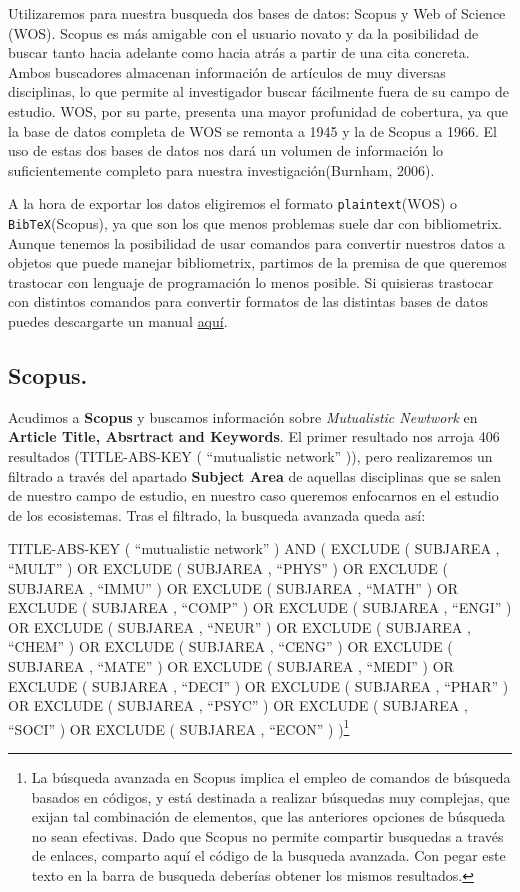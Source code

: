 \documentclass[
]{article}
\begin{document}
Utilizaremos para nuestra busqueda dos bases de datos: Scopus y Web of
Science (WOS). Scopus es más amigable con el usuario novato y da la
posibilidad de buscar tanto hacia adelante como hacia atrás a partir de
una cita concreta. Ambos buscadores almacenan información de artículos
de muy diversas disciplinas, lo que permite al investigador buscar
fácilmente fuera de su campo de estudio. WOS, por su parte, presenta una
mayor profunidad de cobertura, ya que la base de datos completa de WOS
se remonta a 1945 y la de Scopus a 1966. El uso de estas dos bases de
datos nos dará un volumen de información lo suficientemente completo
para nuestra investigación(Burnham, 2006).

A la hora de exportar los datos eligiremos el formato
\texttt{plaintext}(WOS) o \texttt{BibTeX}(Scopus), ya que son los que
menos problemas suele dar con bibliometrix. Aunque tenemos la
posibilidad de usar comandos para convertir nuestros datos a objetos que
puede manejar bibliometrix, partimos de la premisa de que queremos
trastocar con lenguaje de programación lo menos posible. Si quisieras
trastocar con distintos comandos para convertir formatos de las
distintas bases de datos puedes descargarte un manual
\href{https://www.bibliometrix.org/vignettes/Data-Importing-and-Converting.html}{aquí}.

\hypertarget{scopus.}{%
\subsection{Scopus.}\label{scopus.}}

Acudimos a \textbf{Scopus} y buscamos información sobre
\emph{Mutualistic Newtwork} en \textbf{Article Title, Absrtract and
Keywords}. El primer resultado nos arroja 406 resultados (TITLE-ABS-KEY
( ``mutualistic network'' )), pero realizaremos un filtrado a través del
apartado \textbf{Subject Area} de aquellas disciplinas que se salen de
nuestro campo de estudio, en nuestro caso queremos enfocarnos en el
estudio de los ecosistemas. Tras el filtrado, la busqueda avanzada queda
así:

TITLE-ABS-KEY ( ``mutualistic network'' ) AND ( EXCLUDE ( SUBJAREA ,
``MULT'' ) OR EXCLUDE ( SUBJAREA , ``PHYS'' ) OR EXCLUDE ( SUBJAREA ,
``IMMU'' ) OR EXCLUDE ( SUBJAREA , ``MATH'' ) OR EXCLUDE ( SUBJAREA ,
``COMP'' ) OR EXCLUDE ( SUBJAREA , ``ENGI'' ) OR EXCLUDE ( SUBJAREA ,
``NEUR'' ) OR EXCLUDE ( SUBJAREA , ``CHEM'' ) OR EXCLUDE ( SUBJAREA ,
``CENG'' ) OR EXCLUDE ( SUBJAREA , ``MATE'' ) OR EXCLUDE ( SUBJAREA ,
``MEDI'' ) OR EXCLUDE ( SUBJAREA , ``DECI'' ) OR EXCLUDE ( SUBJAREA ,
``PHAR'' ) OR EXCLUDE ( SUBJAREA , ``PSYC'' ) OR EXCLUDE ( SUBJAREA ,
``SOCI'' ) OR EXCLUDE ( SUBJAREA , ``ECON'' ) )\footnote{La búsqueda
  avanzada en Scopus implica el empleo de comandos de búsqueda basados
  en códigos, y está destinada a realizar búsquedas muy complejas, que
  exijan tal combinación de elementos, que las anteriores opciones de
  búsqueda no sean efectivas. Dado que Scopus no permite compartir
  busquedas a través de enlaces, comparto aquí el código de la busqueda
  avanzada. Con pegar este texto en la barra de busqueda deberías
  obtener los mismos resultados.}
\end{document}

